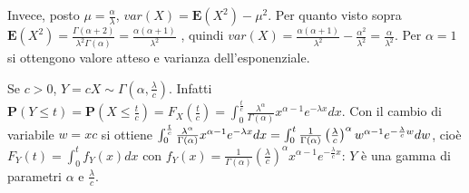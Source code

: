 \documentclass{article}
\begin{document}
\begin{enumerate}
Invece, posto $\mu =\frac{\alpha }{\lambda }$, $var\left( X\right) =\mathbf{E%
}\left( X^{2}\right) -\mu ^{2}$. Per quanto visto sopra $\mathbf{E}\left(
X^{2}\right) =\frac{\Gamma \left( \alpha +2\right) }{\lambda ^{2}\Gamma
\left( \alpha \right) }=\frac{\alpha \left( \alpha +1\right) }{\lambda ^{2}}$%
, quindi $var\left( X\right) =\frac{\alpha \left( \alpha +1\right) }{\lambda
^{2}}-\frac{\alpha ^{2}}{\lambda ^{2}}=\frac{\alpha }{\lambda ^{2}}$. Per $%
\alpha =1$ si ottengono valore atteso e varianza dell'esponenziale.

Se $c>0$, $Y=cX\sim \Gamma \left( \alpha ,\frac{\lambda }{c}\right) $.
Infatti $\mathbf{P}\left( Y\leq t\right) =\mathbf{P}\left( X\leq \frac{t}{c}%
\right) =F_{X}\left( \frac{t}{c}\right) =\int_{0}^{\frac{t}{c}}\frac{\lambda
^{\alpha }}{\Gamma \left( \alpha \right) }x^{\alpha -1}e^{-\lambda x}dx$.
Con il cambio di variabile $w=xc$ si ottiene $\int_{0}^{\frac{t}{c}}\frac{%
\lambda ^{\alpha }}{\Gamma \left( \alpha \right) }x^{\alpha -1}e^{-\lambda
x}dx=\int_{0}^{t}\frac{1}{\Gamma \left( \alpha \right) }\left( \frac{\lambda 
}{c}\right) ^{\alpha }w^{\alpha -1}e^{-\frac{\lambda }{c}w}dw$, cio\`{e} $%
F_{Y}\left( t\right) =\int_{0}^{t}f_{Y}\left( x\right) dx$ con $f_{Y}\left(
x\right) =\frac{1}{\Gamma \left( \alpha \right) }\left( \frac{\lambda }{c}%
\right) ^{\alpha }x^{\alpha -1}e^{-\frac{\lambda }{c}x}$: $Y$ \`{e} una
gamma di parametri $\alpha $ e $\frac{\lambda }{c}$.


\end{enumerate}
\end{document}
